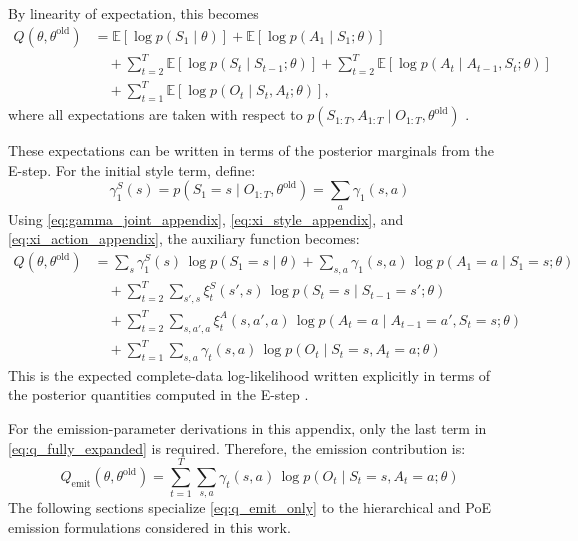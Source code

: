 By linearity of expectation, this becomes
\begin{align}
Q(\theta,\theta^{\mathrm{old}})
&=
\mathbb{E}\!\left[\log p(S_1\mid \theta)\right]
+
\mathbb{E}\!\left[\log p(A_1\mid S_1;\theta)\right]
\nonumber\\
&\quad+
\sum_{t=2}^{T}
\mathbb{E}\!\left[\log p(S_t\mid S_{t-1};\theta)\right]
+
\sum_{t=2}^{T}
\mathbb{E}\!\left[\log p(A_t\mid A_{t-1},S_t;\theta)\right]
\nonumber\\
&\quad+
\sum_{t=1}^{T}
\mathbb{E}\!\left[\log p(O_t\mid S_t,A_t;\theta)\right],
\label{eq:q_linearity}
\end{align}
where all expectations are taken with respect to
\(p(S_{1:T},A_{1:T}\mid O_{1:T},\theta^{\mathrm{old}})\) \cite{Dempster1977,pml1Book}.

These expectations can be written in terms of the posterior marginals from the E-step. 
For the initial style term, define:
\begin{equation}
\gamma_1^{S}(s)
=
p(S_1=s\mid O_{1:T},\theta^{\mathrm{old}})
=
\sum_a \gamma_1(s,a)
\label{eq:gamma_style_init}
\end{equation}
Using \eqref{eq:gamma_joint_appendix}, \eqref{eq:xi_style_appendix}, and
\eqref{eq:xi_action_appendix}, the auxiliary function becomes:
\begin{align}
Q(\theta,\theta^{\mathrm{old}})
&=
\sum_s \gamma_1^{S}(s)\,\log p(S_1=s\mid \theta)
+
\sum_{s,a}\gamma_1(s,a)\,\log p(A_1=a\mid S_1=s;\theta)
\nonumber\\
&\quad+
\sum_{t=2}^{T}\sum_{s',s}
\xi_t^{S}(s',s)\,
\log p(S_t=s\mid S_{t-1}=s';\theta)
\nonumber\\
&\quad+
\sum_{t=2}^{T}\sum_{s,a',a}
\xi_t^{A}(s,a',a)\,
\log p(A_t=a\mid A_{t-1}=a',S_t=s;\theta)
\nonumber\\
&\quad+
\sum_{t=1}^{T}\sum_{s,a}
\gamma_t(s,a)\,
\log p(O_t\mid S_t=s,A_t=a;\theta)
\label{eq:q_fully_expanded}
\end{align}
This is the expected complete-data log-likelihood written explicitly in terms of the posterior quantities computed in the E-step \cite{Dempster1977,rabiner1989tutorial,murphy2002dynamic}.

For the emission-parameter derivations in this appendix, only the last term in
\eqref{eq:q_fully_expanded} is required. Therefore, the emission contribution is:
\begin{equation}
Q_{\mathrm{emit}}(\theta,\theta^{\mathrm{old}})
=
\sum_{t=1}^{T}\sum_{s,a}
\gamma_t(s,a)\,
\log p(O_t\mid S_t=s,A_t=a;\theta)
\label{eq:q_emit_only}
\end{equation}
The following sections specialize \eqref{eq:q_emit_only} to the hierarchical and \ac{PoE} emission formulations considered in this work.





